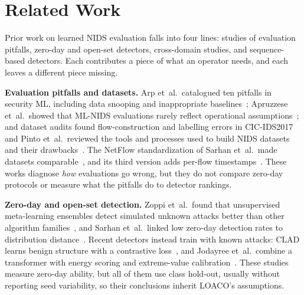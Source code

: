 \documentclass[conference]{IEEEtran}
\begin{document}
\section{Related Work}
\label{sec:related}
Prior work on learned NIDS evaluation falls into four lines: studies of evaluation pitfalls, zero-day and open-set detectors, cross-domain studies, and sequence-based detectors. Each contributes a piece of what an operator needs, and each leaves a different piece missing.

\textbf{Evaluation pitfalls and datasets.} Arp et~al.\ catalogued ten pitfalls in security ML, including data snooping and inappropriate baselines~\cite{arp2022}; Apruzzese et~al.\ showed that ML-NIDS evaluations rarely reflect operational assumptions~\cite{apruzzese2023sok}; and dataset audits found flow-construction and labelling errors in CIC-IDS2017~\cite{engelen2021,rosay2021} and Pinto et~al.\ reviewed the tools and processes used to build NIDS datasets and their drawbacks~\cite{pinto2025}. The NetFlow standardization of Sarhan et~al.\ made datasets comparable~\cite{sarhan2021netflow,sarhan2022standard}, and its third version adds per-flow timestamps~\cite{luay2025}. These works diagnose \emph{how} evaluations go wrong, but they do not compare zero-day protocols or measure what the pitfalls do to detector rankings.

\textbf{Zero-day and open-set detection.} Zoppi et~al.\ found that unsupervised meta-learning ensembles detect simulated unknown attacks better than other algorithm families~\cite{zoppi2023}, and Sarhan et~al.\ linked low zero-day detection rates to distribution distance~\cite{sarhan2023zeroshot}. Recent detectors instead train with known attacks: CLAD learns benign structure with a contrastive loss~\cite{wilkie2026}, and Jodayree et~al.\ combine a transformer with energy scoring and extreme-value calibration~\cite{jodayree2026}. These studies measure zero-day ability, but all of them use class hold-out, usually without reporting seed variability, so their conclusions inherit LOACO's assumptions.
\end{document}
